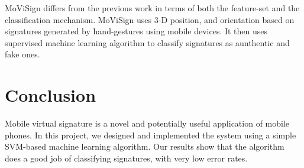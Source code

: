 \documentclass[12pt]{article}
\begin{document}
MoViSign differs from the previous work in terms of both the feature-set and the classification mechanism. MoViSign uses 3-D position, and orientation based on signatures generated by hand-gestures using mobile devices. It then uses supervised machine learning algorithm to classify signatures as aunthentic and fake ones.
 
\section{Conclusion}

Mobile virtual signature is a novel and potentially useful application of mobile phones. In this project, we designed and implemented the system using a simple SVM-based machine learning algorithm. Our results show that the algorithm does a good job of classifying signatures, with very low error rates.


	
\end{document}
